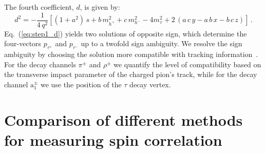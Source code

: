 \documentclass[a4paper,12pt,twocolumn]{article}
\numberwithin{equation}{section} %
\newcommand{\Papm}{\ensuremath{\textrm{a}_{1}^{\pm}}\xspace}
\newcommand{\Pgppm}{\ensuremath{\pi^{\pm}}\xspace}
\newcommand{\Pgrpm}{\ensuremath{\rho^{\pm}}\xspace}
\newcommand{\Pgt}{\ensuremath{\tau}\xspace}
\newcommand{\Pgtm}{\ensuremath{\tau^{-}}\xspace}
\newcommand{\Pgtp}{\ensuremath{\tau^{+}}\xspace}
\newcommand{\h}{\ensuremath{h}\xspace}
\begin{document}
The fourth coefficient, $d$, is given by:
\begin{equation}
d^{2} = -\frac{1}{4 \, q^{2}} \left[ (1 + a^{2}) \, s + b \, m_{\h^{+}}^{2} + c \, m_{\h^{-}}^{2} - 4 m_{\Pgt}^{2} + 2 \, (a \, c \, y - a \, b \, x - b \, c \, z) \right] \, .
\label{eq:step1_d}
\end{equation}
Eq.~(\ref{eq:step1_d}) yields two solutions of opposite sign, which determine the four-vectors $p_{\Pgtp}$ and $p_{\Pgtm}$ up to a twofold sign ambiguity. We resolve the sign ambiguity by choosing the solution more compatible with tracking information~\cite{Kuhn:1993ra}.
For the decay channels $\Pgppm$ and $\Pgrpm$ we quantify the level of compatibility based on the transverse impact parameter of the charged pion's track, while for the decay channel $\Papm$ we use the position of the $\Pgt$ decay vertex.


\section{Comparison of different methods for measuring spin correlation}
\label{sec:appendixB}
\end{document}
